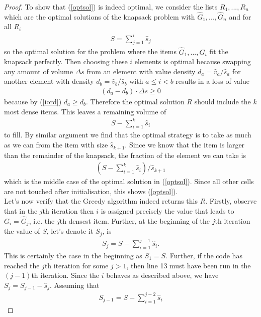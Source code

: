 \documentclass{article}
\begin{document}
\begin{proof}
	To show that (\ref{optsol}) is indeed optimal,
	we consider the lists $R_1, ..., R_n$ which are the optimal
	solutions of the knapsack problem with $\hat G_1, ..., \hat G_n$ and for all $R_i$
	\begin{align*}
		S = \sum_{j=1}^i \hat s_j
	\end{align*}
	so the optimal solution for the problem where the items $\hat G_1, ...,\hat G_i$
	fit the knapsack perfectly. Then choosing these $i$ elements
	is optimal because swapping any amount of volume $\Delta s$ from an
	element with value density $d_a = \hat v_a / \hat s_a$ for another element
	with density $d_b = \hat v_b / \hat s_b$ with $a\leq i < b$ results in a
	loss of value
	\begin{align*}
		(d_a - d_b) \cdot \Delta s \geq 0
	\end{align*}
	because by (\ref{iord}) $d_a\geq d_b$. Therefore the optimal solution $R$
	should include the $k$ most dense items. This leaves a remaining volume
	of
	\begin{align*}
		S - \sum_{i=1}^k \hat s_i
	\end{align*}
	to fill. By similar argument we find that the optimal strategy is to take
	as much as we can from the item with size $\hat s_{k+1}$. Since we know
	that the item is larger than the remainder of the knapsack, the fraction
	of the element we can take is
	\begin{align*}
		\left(S - \sum_{i=1}^k \hat s_i\right)/\hat s_{k+1}
	\end{align*}
	which is the middle case of the optimal solution in (\ref{optsol}).
	Since all other cells are not touched after initialisation, this shows (\ref{optsol}).\\
	Let's now verify that the Greedy algorithm indeed returns this $R$.
	Firstly, observe that in the $j$th iteration then
	$i$ is assigned precisely the value that leads to $G_i=\hat G_j$,
	i.e. the $j$th densest item.
	Further, at the beginning of the $j$th iteration the value of $S$, let's denote it $S_j$,
	is
	\begin{align}
		\label{sj}
		S_j = S - \sum_{i=1}^{j-1} \hat s_i.
	\end{align}
	This is certainly the case in the beginning as $S_1=S$. Further, if the code
	has reached the $j$th iteration for some $j>1$, then line 13 must have been run in the
	$(j-1)$th iteration. Since the $i$ behaves as described above, we have
	$S_j=S_{j-1}-\hat s_j$. Assuming that
	\begin{align*}
		S_{j-1} = S - \sum_{i=1}^{j-2} \hat s_i

\end{align*}
\end{proof}
\end{document}
